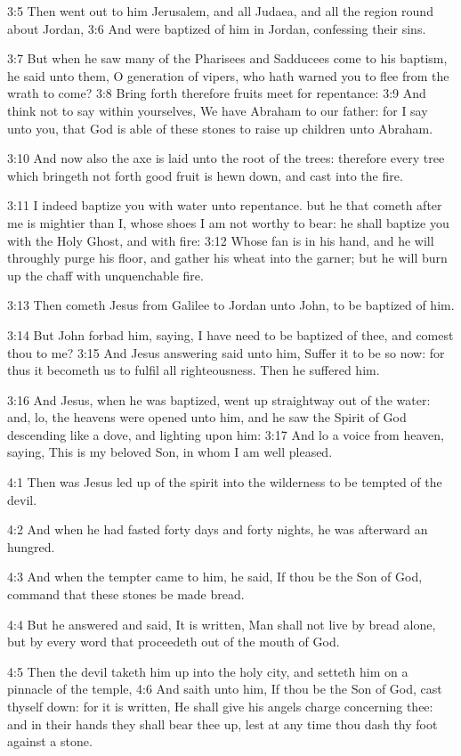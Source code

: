 3:5 Then went out to him Jerusalem, and all Judaea, and all the region
round about Jordan, 3:6 And were baptized of him in Jordan, confessing
their sins.

3:7 But when he saw many of the Pharisees and Sadducees come to his
baptism, he said unto them, O generation of vipers, who hath warned
you to flee from the wrath to come?  3:8 Bring forth therefore fruits
meet for repentance: 3:9 And think not to say within yourselves, We
have Abraham to our father: for I say unto you, that God is able of
these stones to raise up children unto Abraham.

3:10 And now also the axe is laid unto the root of the trees:
therefore every tree which bringeth not forth good fruit is hewn down,
and cast into the fire.

3:11 I indeed baptize you with water unto repentance. but he that
cometh after me is mightier than I, whose shoes I am not worthy to
bear: he shall baptize you with the Holy Ghost, and with fire: 3:12
Whose fan is in his hand, and he will throughly purge his floor, and
gather his wheat into the garner; but he will burn up the chaff with
unquenchable fire.

3:13 Then cometh Jesus from Galilee to Jordan unto John, to be
baptized of him.

3:14 But John forbad him, saying, I have need to be baptized of thee,
and comest thou to me?  3:15 And Jesus answering said unto him, Suffer
it to be so now: for thus it becometh us to fulfil all righteousness.
Then he suffered him.

3:16 And Jesus, when he was baptized, went up straightway out of the
water: and, lo, the heavens were opened unto him, and he saw the
Spirit of God descending like a dove, and lighting upon him: 3:17 And
lo a voice from heaven, saying, This is my beloved Son, in whom I am
well pleased.

4:1 Then was Jesus led up of the spirit into the wilderness to be
tempted of the devil.

4:2 And when he had fasted forty days and forty nights, he was
afterward an hungred.

4:3 And when the tempter came to him, he said, If thou be the Son of
God, command that these stones be made bread.

4:4 But he answered and said, It is written, Man shall not live by
bread alone, but by every word that proceedeth out of the mouth of
God.

4:5 Then the devil taketh him up into the holy city, and setteth him
on a pinnacle of the temple, 4:6 And saith unto him, If thou be the
Son of God, cast thyself down: for it is written, He shall give his
angels charge concerning thee: and in their hands they shall bear thee
up, lest at any time thou dash thy foot against a stone.

